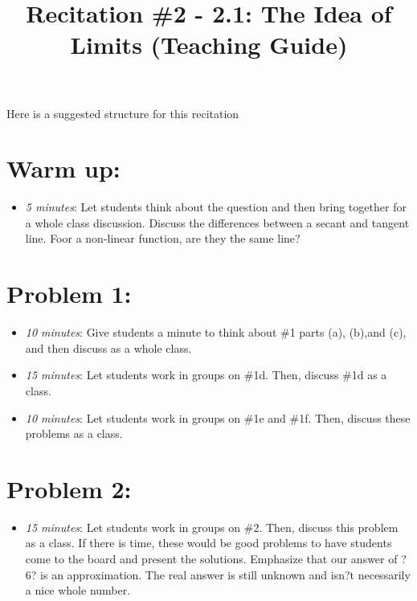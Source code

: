 \documentclass[handout,nooutcomes]{ximera}
\title{Recitation \#2 - 2.1:  The Idea of Limits (Teaching Guide)}
\begin{document}
\begin{abstract}		\end{abstract}
\maketitle

Here is a suggested structure for this recitation

\section*{Warm up:} 

	\begin{itemize}
	
	\item  \emph{5 minutes}:  Let students think about the question and then bring together for a whole class discussion.  Discuss the differences between a secant and tangent line.  Foor a non-linear function, are they the same line?
	
	\end{itemize}


\section*{Problem 1:}

	\begin{itemize}
	
	\item  \emph{10 minutes}:  Give students a minute to think about \#1 parts (a), (b),and (c), and then discuss as a whole class.
	
	\item  \emph{15 minutes}:  Let students work in groups on \#1d.  Then, discuss \#1d as a class.
	
	\item  \emph{10 minutes}:  Let students work in groups on \#1e and \#1f.  Then, discuss these problems as a class.
		
	\end{itemize}
	
	
	
\section*{Problem 2:}

	\begin{itemize}
	
	\item  \emph{15 minutes}:  Let students work in groups on \#2.  Then, discuss this problem as a class.  If there is time, these would be good problems to have students come to the board and present the solutions.  Emphasize that our answer of ?6? is an approximation.  The real answer is still unknown and isn?t necessarily a nice whole number.	
	
	\end{itemize}
	
	
	
\end{document}
